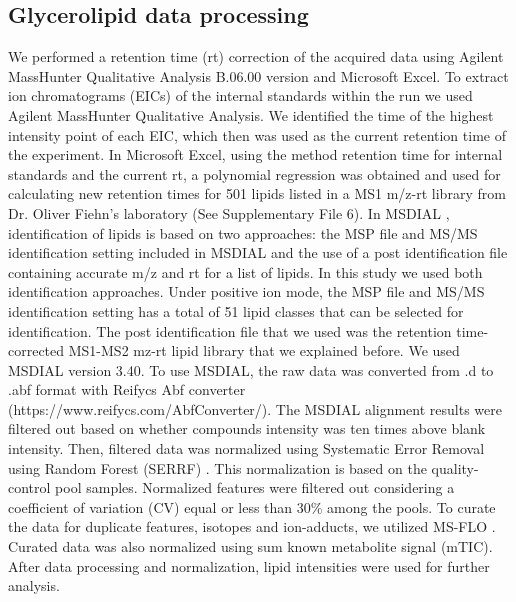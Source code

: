 \documentclass[9pt,twocolumn,twoside,lineno]{BioRxiv}
\begin{document}
\subsection{Glycerolipid data processing}
We performed a retention time (rt) correction of the acquired data using Agilent MassHunter Qualitative Analysis B.06.00 version and Microsoft Excel. 
To extract ion chromatograms (EICs) of the internal standards within the run we used Agilent MassHunter Qualitative Analysis.
We identified the time of the highest intensity point of each EIC, which then was used as the current retention time of the experiment. 
In Microsoft Excel, using the method retention time for internal standards and the current rt, a polynomial regression was obtained and used for calculating new retention times for 501 lipids listed in a MS1 m/z-rt library from Dr. Oliver Fiehn's laboratory (See Supplementary File 6).
In MSDIAL \cite{Tsugawa2015-kh}, identification of lipids is based on two approaches: the MSP file and MS/MS identification setting included in MSDIAL and the use of a post identification file containing accurate m/z and rt for a list of lipids. 
In this study we used both identification approaches. 
Under positive ion mode, the MSP file and MS/MS identification setting has a total of 51 lipid classes  that can be selected for identification. 
The post identification file that we used was the retention time-corrected MS1-MS2 mz-rt lipid library that we explained before. 
We used MSDIAL \cite{Tsugawa2015-kh} version 3.40. 
To use MSDIAL, the raw data was converted from .d to .abf format with Reifycs Abf converter (https://www.reifycs.com/AbfConverter/). 
The MSDIAL alignment results were filtered out based on whether compounds intensity was ten times above blank intensity. 
Then, filtered data was normalized using Systematic Error Removal using Random Forest (SERRF) \cite{Fan2019}.
This normalization is based on the quality-control pool samples. 
Normalized features were filtered out considering a coefficient of variation (CV) equal or less than 30\% among the pools. 
To curate the data for duplicate features, isotopes and ion-adducts, we utilized MS-FLO \cite{DeFelice2017-ms}.
Curated data was also normalized using sum known metabolite signal (mTIC). 
After data processing and normalization, lipid intensities were used for further analysis.
\end{document}
